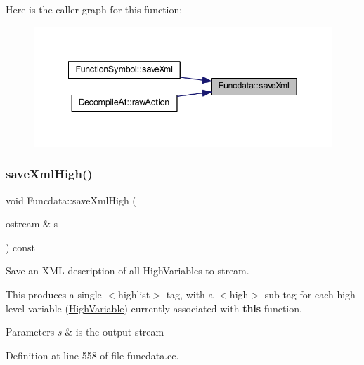 Here is the caller graph for this function\+:
\nopagebreak
\begin{figure}[H]
\begin{center}
\leavevmode
\includegraphics[width=342pt]{class_funcdata_a7d1d8baaefe519897b72e8537f0cb335_icgraph}
\end{center}
\end{figure}
\mbox{\label{class_funcdata_accde64f2642f6e86545df826e2751f8b}} 
\subsubsection{\texorpdfstring{saveXmlHigh()}{saveXmlHigh()}}
{\footnotesize\ttfamily void Funcdata\+::save\+Xml\+High (\begin{DoxyParamCaption}\item[{ostream \&}]{s }\end{DoxyParamCaption}) const}



Save an X\+ML description of all High\+Variables to stream. 

This produces a single $<$highlist$>$ tag, with a $<$high$>$ sub-\/tag for each high-\/level variable (\mbox{\hyperlink{class_high_variable}{High\+Variable}}) currently associated with {\bfseries{this}} function. 
\begin{DoxyParams}{Parameters}
{\em s} & is the output stream \\
\hline
\end{DoxyParams}


Definition at line 558 of file funcdata.\+cc.

